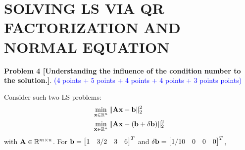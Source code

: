 \documentclass[english,onecolumn]{IEEEtran}
\begin{document}
\newpage
\section{SOLVING LS VIA QR FACTORIZATION AND NORMAL EQUATION}
\noindent\textbf{Problem 4 [Understanding the influence of the condition number to the solution.]}. \textcolor{blue}{(4 points + 5 points + 4 points + 4 points + 3 points points) }

Consider such two LS problems:
\begin{align}
    &\min_{{\bf x}\in\mathbb{R}^n} \|{\bf Ax - b}\|_2^2 \label{axb}\\
    &\min_{{\bf x}\in\mathbb{R}^n} \|{\bf A}{\bf x} - ({\bf b}+\delta{\bf b })\|_2^2 \nonumber%
\end{align}
with ${\bf A}\in \mathbb{R}^{m\times n}$. For ${\bf b} = \begin{bmatrix}
    1 & 3/2 & 3 & 6
    \end{bmatrix}^T$
    and 
    $\delta{\bf b} = \begin{bmatrix}
    1/10 & 0 & 0 & 0
    \end{bmatrix}^T$,
\end{document}
